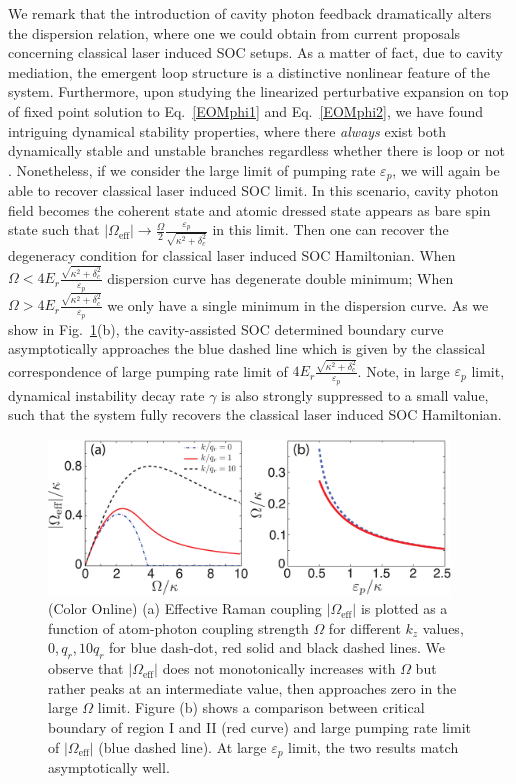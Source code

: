 \documentclass[atoms,article,submit,moreauthors,pdftex,12pt,a4paper]{mdpi}
\begin{document}
We remark that the introduction of cavity photon feedback dramatically alters the dispersion relation, where one we could obtain from current proposals concerning classical laser induced SOC setups. As a matter of fact, due to cavity mediation, the emergent loop structure is a distinctive nonlinear feature of the system. Furthermore, upon studying the linearized perturbative expansion on top of fixed point solution to Eq.~\ref{EOMphi1} and Eq.~\ref{EOMphi2}, we have found intriguing dynamical stability properties, where there {\em always} exist both dynamically stable and unstable branches regardless whether there is loop or not \cite{cavitySOC}. Nonetheless, if we consider the large limit of pumping rate $\varepsilon_p$, we will again be able to recover classical laser induced SOC limit. In this scenario, cavity photon field becomes the coherent state and atomic dressed state appears as bare spin state such that $|\Omega_\text{eff}|\rightarrow\frac{\Omega}{2}\frac{\varepsilon_p}{\sqrt{\kappa^2+\delta_c^2}}$ in this limit. Then one can recover the degeneracy condition for classical laser induced SOC Hamiltonian. When $\Omega<4E_r\frac{\sqrt{\kappa^2+\delta_c^2}}{\varepsilon_p}$ dispersion curve has degenerate double minimum; When $\Omega>4E_r\frac{\sqrt{\kappa^2+\delta_c^2}}{\varepsilon_p}$ we only have a single minimum in the dispersion curve. As we show in Fig.~\ref{fig2}(b), the cavity-assisted SOC determined boundary curve asymptotically approaches the blue dashed line which is given by the classical correspondence of large pumping rate limit of  $4E_r\frac{\sqrt{\kappa^2+\delta_c^2}}{\varepsilon_p}$. Note, in large $\varepsilon_p$ limit, dynamical instability decay rate $\gamma$ is also strongly suppressed to a small value, such that the system fully recovers the classical laser induced SOC Hamiltonian. 

\begin{figure}[htp]
\includegraphics[width=0.95\textwidth]{fig2}\caption{(Color Online) (a) Effective Raman coupling $|\Omega_\text{eff}|$ is plotted as a function of atom-photon coupling strength $\Omega$ for different $k_z$ values, $0$,\,$q_r$,\,$10q_r$ for blue dash-dot, red solid and black dashed  lines. We observe that $|\Omega_\text{eff}|$ does not monotonically  increases with $\Omega$ but rather peaks at an intermediate value, then approaches zero in the large $\Omega$ limit. Figure (b) shows a comparison between critical boundary of region I and II (red curve) and large pumping rate limit of $|\Omega_\text{eff}|$ (blue dashed line). At large $\varepsilon_p$ limit, the two results match asymptotically well.  }\label{fig2}
\end{figure}
\end{document}
